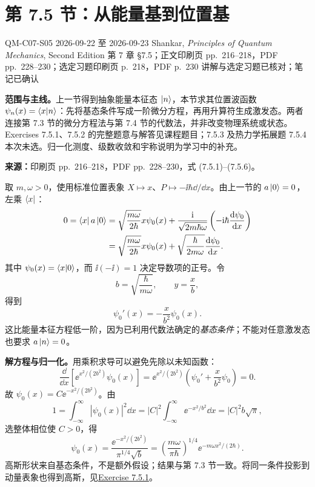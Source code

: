 \section{第 7.5 节：从能量基到位置基}
\label{section:QM-C07-S05}
\studymeta
  {QM-C07-S05}
  {2026-09-22 至 2026-09-23}
  {Shankar, \textit{Principles of Quantum Mechanics}, Second Edition}
  {第 7 章 \S 7.5；正文印刷页 pp.~216--218，PDF pp.~228--230；选定习题印刷页 p.~218，PDF p.~230}
  {讲解与选定习题已核对；笔记已确认}

\textbf{范围与主线。}上一节得到抽象能量本征态 $\left|n\right\rangle$，本节求其位置波函数 $\psi_n(x)=\left\langle x \middle| n \right\rangle$：先将基态条件写成一阶微分方程，再用升算符生成激发态。两者连接第 7.3 节的微分方程法与第 7.4 节的代数法，并非改变物理系统或状态。Exercises 7.5.1、7.5.2 的完整题意与解答见课程题目；7.5.3 及热力学拓展题 7.5.4 本次未选。归一化测度、级数收敛和宇称说明为学习中的补充。

\textbf{来源：}印刷页 pp.~216--218，PDF pp.~228--230，式 (7.5.1)--(7.5.6)。

取 $m,\omega>0$，使用标准位置表象 $X\mapsto x$、$P\mapsto-\ii\hbar\dd/\dd x$。由上一节的 $a\left|0\right\rangle=0$，左乘 $\left\langle x\right|$：
\begin{align}
  0=\left\langle x\right| a\left|0\right\rangle
    &=\sqrt{\frac{m\omega}{2\hbar}}x\psi_0(x)
      +\frac{\mathrm{i}}{\sqrt{2m\hbar\omega}}
         \left(-\mathrm{i}\hbar\frac{\mathop{}\!\mathrm{d}\psi_0}{\mathop{}\!\mathrm{d} x}\right)\\
    &=\sqrt{\frac{m\omega}{2\hbar}}x\psi_0(x)
      +\sqrt{\frac{\hbar}{2m\omega}}\frac{\mathop{}\!\mathrm{d}\psi_0}{\mathop{}\!\mathrm{d} x}.
\end{align}
其中 $\psi_0(x)=\left\langle x \middle| 0 \right\rangle$，而 $\ii(-\ii)=1$ 决定导数项的正号。令
\begin{equation}
  b=\sqrt{\frac{\hbar}{m\omega}},\qquad y=\frac{x}{b},
\end{equation}
得到
\begin{equation}
  \boxed{\psi_0'(x)=-\frac{x}{b^2}\psi_0(x)}.
  \label{eq:QM-C07-S05-ground-ode}
\end{equation}
这比能量本征方程低一阶，因为已利用代数法确定的\emph{基态条件}；不能对任意激发态也要求 $a\left|n\right\rangle=0$。

\textbf{解方程与归一化。}用乘积求导可以避免先除以未知函数：
\begin{equation}
  \frac{\dd}{\dd x}\left[\ee^{x^2/(2b^2)}\psi_0(x)\right]
  =\ee^{x^2/(2b^2)}\left(\psi_0'+\frac{x}{b^2}\psi_0\right)=0.
\end{equation}
故 $\psi_0(x)=C\ee^{-x^2/(2b^2)}$。由
\begin{equation}
  1=\int_{-\infty}^{\infty}|\psi_0(x)|^2\dd x
   =|C|^2\int_{-\infty}^{\infty}\ee^{-x^2/b^2}\dd x
   =|C|^2b\sqrt\pi,
\end{equation}
选整体相位使 $C>0$，得
\begin{equation}
  \boxed{\psi_0(x)=\frac{\ee^{-x^2/(2b^2)}}{\pi^{1/4}\sqrt b}
    =\left(\frac{m\omega}{\pi\hbar}\right)^{1/4}
        \ee^{-m\omega x^2/(2\hbar)}}.
  \label{eq:QM-C07-S05-ground-function}
\end{equation}
高斯形状来自基态条件，不是额外假设；结果与第 7.3 节一致。将同一条件投影到动量表象也得到高斯，见\hyperref[exercise:QM-C07-S05-E01]{Exercise 7.5.1}。


